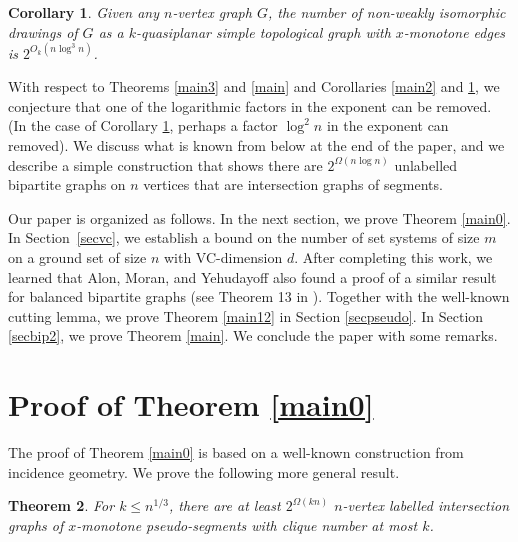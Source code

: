 \documentclass[11pt]{article}
\theoremstyle{plain}
\newtheorem{theorem}{Theorem}[section]
\newtheorem{corollary}[theorem]{Corollary}
\theoremstyle{definition}
\theoremstyle{remark}
\begin{document}
\begin{corollary}\label{drawcor}
Given any $n$-vertex graph $G$, the number of non-weakly isomorphic drawings of $G$ as a $k$-quasiplanar simple topological graph with $x$-monotone edges is 
$2^{O_k(n\log^3 n)}$. 
\end{corollary} 

With respect to Theorems \ref{main3} and \ref{main} and Corollaries \ref{main2} and \ref{drawcor}, we conjecture that one of the logarithmic factors in the exponent can be removed. (In the case of Corollary \ref{drawcor}, perhaps a factor $\log^2 n$ in the exponent can removed). We discuss what is known from below at the end of the paper, and we describe a simple construction that shows there are $2^{\Omega(n \log n)}$ unlabelled bipartite graphs on $n$ vertices that are intersection graphs of segments.   

Our paper is organized as follows.  In the next section, we prove Theorem \ref{main0}.  In Section~\ref{secvc}, we establish a bound on the number of set systems of size $m$ on a ground set of size $n$ with VC-dimension $d$. After completing this work, we learned that Alon, Moran, and Yehudayoff also found a proof of a similar result for balanced bipartite graphs (see Theorem 13 in \cite{alon2}). 
 Together with the well-known cutting lemma, we prove Theorem \ref{main12} in Section \ref{secpseudo}.  In Section \ref{secbip2}, we prove Theorem \ref{main}.  We conclude the paper with some remarks.


\section{Proof of Theorem \ref{main0}}

The proof of Theorem \ref{main0} is based on a well-known construction from incidence geometry.  We prove the following more general result. 



\begin{theorem}\label{main4}
For $k \leq n^{1/3}$, there are at least $2^{\Omega(kn)}$ $n$-vertex labelled intersection graphs of $x$-monotone pseudo-segments with clique number at most $k$.

\end{theorem}
 
\end{document}
